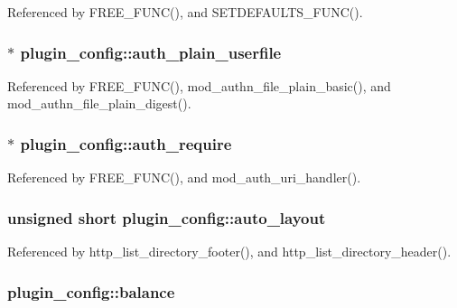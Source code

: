 Referenced by F\-R\-E\-E\-\_\-\-F\-U\-N\-C(), and S\-E\-T\-D\-E\-F\-A\-U\-L\-T\-S\-\_\-\-F\-U\-N\-C().

\hypertarget{structplugin__config_aca323cf277c3136664e394c046ed33d6}{
\subsubsection[{auth\-\_\-plain\-\_\-userfile}]{$\ast$ plugin\-\_\-config\-::auth\-\_\-plain\-\_\-userfile}}\label{structplugin__config_aca323cf277c3136664e394c046ed33d6}


Referenced by F\-R\-E\-E\-\_\-\-F\-U\-N\-C(), mod\-\_\-authn\-\_\-file\-\_\-plain\-\_\-basic(), and mod\-\_\-authn\-\_\-file\-\_\-plain\-\_\-digest().

\hypertarget{structplugin__config_a5e969ea12a2d4e00062852d22b1e33a2}{
\subsubsection[{auth\-\_\-require}]{$\ast$ plugin\-\_\-config\-::auth\-\_\-require}}\label{structplugin__config_a5e969ea12a2d4e00062852d22b1e33a2}


Referenced by F\-R\-E\-E\-\_\-\-F\-U\-N\-C(), and mod\-\_\-auth\-\_\-uri\-\_\-handler().

\hypertarget{structplugin__config_a7b6c9c6c868b413dfdb80c60b7ccc8af}{
\subsubsection[{auto\-\_\-layout}]{\setlength{\rightskip}{0pt plus 5cm}unsigned short plugin\-\_\-config\-::auto\-\_\-layout}}\label{structplugin__config_a7b6c9c6c868b413dfdb80c60b7ccc8af}


Referenced by http\-\_\-list\-\_\-directory\-\_\-footer(), and http\-\_\-list\-\_\-directory\-\_\-header().

\hypertarget{structplugin__config_a1bf1808bb760f9cb8710b79ed54b0408}{
\subsubsection[{balance}]{ plugin\-\_\-config\-::balance}}\label{structplugin__config_a1bf1808bb760f9cb8710b79ed54b0408}


